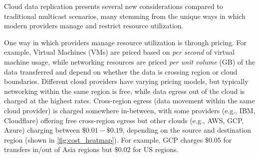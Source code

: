 

 


Cloud data replication presents several new considerations compared to traditional multicast scenarios, many stemming from the unique ways in which modern providers manage and restrict resource utilization. 

  One way in which providers manage resource utilization is through pricing.
For example, Virtual Machines (VMs) are priced based on  \textit{per second} of virtual machine usage, while networking resources are priced \textit{per unit volume} (GB) of the data transferred and depend on whether the data is crossing region or cloud boundaries.
Different cloud providers have varying pricing models, but typically networking within the same region is free, while data egress out of the cloud is charged at the highest rates. Cross-region egress (data movement within the same cloud provider) is charged somewhere in-between, with some providers (e.g., IBM, Cloudflare) offering free cross-region egress but other clouds (e.g., AWS, GCP, Azure) charging between $\$0.01-\$0.19$, depending on the source and destination region (shown in \cref{fig:cost_heatmap}). For example, GCP charges $\$0.05$ for transfers in/out of Asia regions but $\$0.02$ for US regions.


